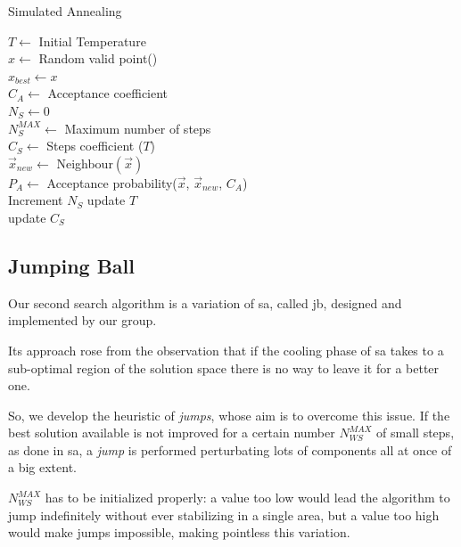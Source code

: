 \documentclass[journal]{IEEEtran}
\begin{document}
\begin{algorithm}
\caption{Simulated Annealing} \label{algo:SA}

$T \gets$ Initial Temperature \\
$x \gets$ Random valid point() \\
$x_{best} \gets x$ \\
$C_A \gets$ Acceptance coefficient \\
$N_S \gets 0$ \\
$N_S^{MAX} \gets $ Maximum number of steps \\

 {
	$C_S \gets$ Steps coefficient ($T$) \\
	 {
		$\vec{x}_{new} \gets$ Neighbour$(\vec{x})$\\
		$P_A \gets$ Acceptance probability($\vec{x}$, $\vec{x}_{new}$, $C_A$) \\
		Increment $N_S$
	}
	update $T$\\
	update $C_S$\\
}
\end{algorithm}

\subsection{Jumping Ball}

Our second search algorithm is a variation of \gls{sa}, called \gls{jb}, designed and implemented by our group.

Its approach rose from the observation that if the cooling phase of \gls{sa} takes to a sub-optimal region of the solution space there is no way to leave it for a better one.

So, we develop the heuristic of \emph{jumps}, whose aim is to overcome this issue. If the best solution available is not improved for a certain number $N_{WS}^{MAX}$ of small steps, as done in \gls{sa}, a \emph{jump} is performed perturbating lots of components all at once of a big extent.

$N_{WS}^{MAX}$ has to be initialized properly: a value too low would lead the algorithm to jump indefinitely without ever stabilizing in a single area, but a value too high would make jumps impossible, making pointless this variation.
\end{document}
